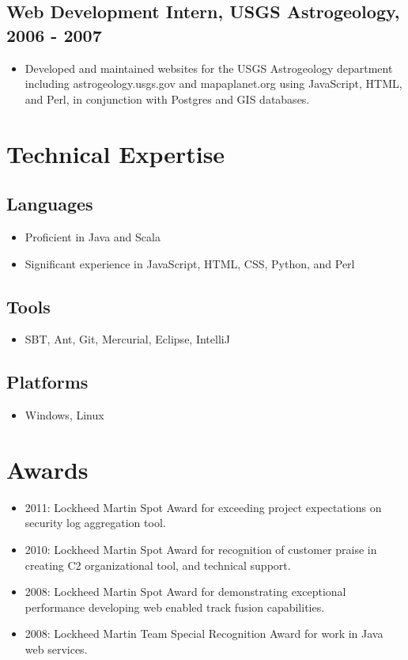 \documentclass[11pt]{article}
\begin{document}
\subsection*{Web Development Intern, USGS Astrogeology, 2006 - 2007}
\label{sec-1.2}

\begin{itemize}
\item Developed and maintained websites for the USGS Astrogeology department including astrogeology.usgs.gov and mapaplanet.org using JavaScript, HTML, and Perl, in conjunction with Postgres and GIS databases.
\end{itemize}
\section*{Technical Expertise}
\label{sec-2}

\subsection*{Languages}
\label{sec-2.1}

\begin{itemize}
\item Proficient in Java and Scala
\item Significant experience in JavaScript, HTML, CSS, Python, and Perl
\end{itemize}
\subsection*{Tools}
\label{sec-2.2}

\begin{itemize}
\item SBT, Ant, Git, Mercurial, Eclipse, IntelliJ
\end{itemize}
\subsection*{Platforms}
\label{sec-2.3}

\begin{itemize}
\item Windows, Linux
\end{itemize}
\section*{Awards}
\label{sec-3}

\begin{itemize}
\item 2011: Lockheed Martin Spot Award for exceeding project expectations on security log aggregation tool.
\item 2010: Lockheed Martin Spot Award for recognition of customer praise in creating C2 organizational tool, and technical support.
\item 2008: Lockheed Martin Spot Award for demonstrating exceptional performance developing web enabled track fusion capabilities.
\item 2008: Lockheed Martin Team Special Recognition Award for work in Java web services.
\end{itemize}
\end{document}
